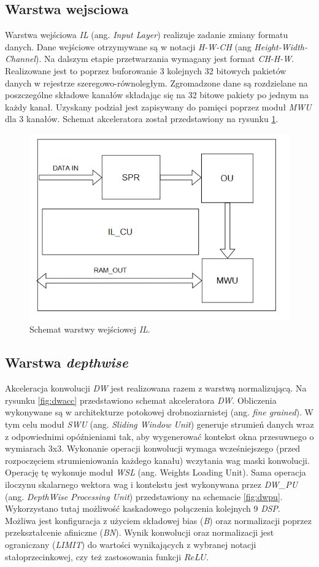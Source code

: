\subsection{Warstwa wejsciowa}
Warstwa wejściowa \emph{IL} (ang. \emph{Input Layer}) realizuje zadanie zmiany formatu danych.
Dane wejściowe otrzymywane są w notacji \emph{H-W-CH} (ang \emph{Height-Width-Channel}).
Na dalszym etapie przetwarzania wymagany jest format \emph{CH-H-W}.
Realizowane jest to poprzez buforowanie 3 kolejnych 32 bitowych pakietów danych w rejestrze szeregowo-równoległym.
Zgromadzone dane są rozdzielane na poszczególne składowe kanałów składając się na 32 bitowe pakiety po jednym na każdy kanał.
Uzyskany podział jest zapisywany do pamięci poprzez moduł \emph{MWU} dla 3 kanałów.
Schemat akceleratora został przedstawiony na rysunku \ref{fig:il}.
\begin{figure}
    \centering
    \includegraphics[width=0.8\linewidth]{images/ILACC.png}
    \caption{Schemat warstwy wejściowej \emph{IL}.}
    \label{fig:il}
\end{figure}

\subsection{Warstwa \emph{depthwise}}
Akceleracja konwolucji \emph{DW} jest realizowana razem z warstwą normalizującą.
Na rysunku \ref{fig:dwacc} przedstawiono schemat akceleratora \emph{DW}.
Obliczenia wykonywane są w architekturze potokowej drobnoziarnistej (ang. \emph{fine grained}). 
W tym celu moduł \emph{SWU} (ang. \emph{Sliding Window Unit}) generuje strumień danych wraz z odpowiednimi opóźnieniami tak, aby wygenerować kontekst okna przesuwnego o wymiarach 3x3.
Wykonanie operacji konwolucji wymaga wcześniejszego (przed rozpoczęciem strumieniowania każdego kanału) wczytania wag maski konwolucji.
Operację tę wykonuje moduł \emph{WSL} (ang. Weights Loading Unit).
Sama operacja iloczynu skalarnego wektora wag i kontekstu jest wykonywana przez \emph{DW\_PU} (ang. \emph{DepthWise Processing Unit}) przedstawiony na schemacie \ref{fig:dwpu}.
Wykorzystano tutaj możliwość kaskadowego połączenia kolejnych 9 \emph{DSP}. 
Możliwa jest konfiguracja z użyciem składowej bias (\emph{B}) oraz normalizacji poprzez przekształcenie afiniczne (\emph{BN}).
Wynik konwolucji oraz normalizacji jest ograniczany (\emph{LIMIT}) do wartości wynikających z wybranej notacji stałoprzecinkowej, czy też zastosowania funkcji $ReLU$.


